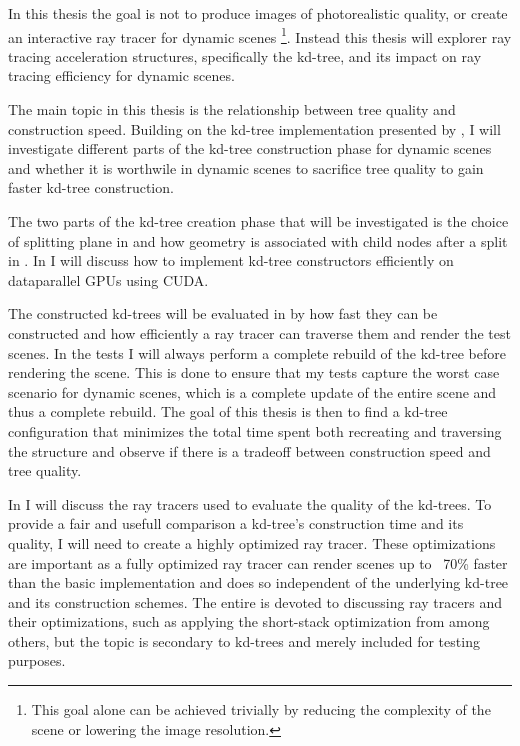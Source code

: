 In this thesis the goal is not to produce images of photorealistic quality, or
create an interactive ray tracer for dynamic scenes \footnote{This goal alone
  can be achieved trivially by reducing the complexity of the scene or lowering
  the image resolution.}. Instead this thesis will explorer ray tracing
acceleration structures, specifically the kd-tree, and its impact on ray tracing
efficiency for dynamic scenes.

The main topic in this thesis is the relationship between tree quality and
construction speed. Building on the kd-tree implementation presented by \zhou{},
I will investigate different parts of the kd-tree construction phase for dynamic
scenes and whether it is worthwile in dynamic scenes to sacrifice tree quality
to gain faster kd-tree construction.

The two parts of the kd-tree creation phase that will be investigated is the
choice of splitting plane in  and how geometry is
associated with child nodes after a split in
. In  I will discuss
how to implement kd-tree constructors efficiently on dataparallel GPUs using
CUDA.

The constructed kd-trees will be evaluated in  by how
fast they can be constructed and how efficiently a ray tracer can traverse them
and render the test scenes. In the tests I will always perform a complete
rebuild of the kd-tree before rendering the scene. This is done to ensure that
my tests capture the worst case scenario for dynamic scenes, which is a complete
update of the entire scene and thus a complete rebuild. The goal of this thesis
is then to find a kd-tree configuration that minimizes the total time spent both
recreating and traversing the structure and observe if there is a tradeoff
between construction speed and tree quality.

In  I will discuss the ray tracers used to evaluate
the quality of the kd-trees. To provide a fair and usefull comparison a
kd-tree's construction time and its quality, I will need to create a highly
optimized ray tracer. These optimizations are important as a fully optimized ray
tracer can render scenes up to ~70\% faster than the basic implementation and
does so independent of the underlying kd-tree and its construction schemes. The
entire  is devoted to discussing ray tracers and
their optimizations, such as applying the short-stack optimization from \horn{}
among others, but the topic is secondary to kd-trees and merely included for
testing purposes.

